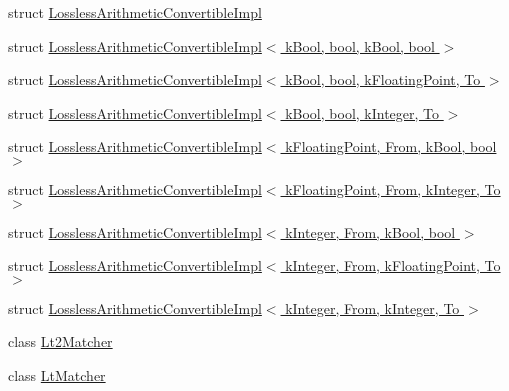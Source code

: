 \begin{DoxyCompactItemize}
\item 
struct \hyperlink{structtesting_1_1internal_1_1_lossless_arithmetic_convertible_impl}{Lossless\+Arithmetic\+Convertible\+Impl}
\item 
struct \hyperlink{structtesting_1_1internal_1_1_lossless_arithmetic_convertible_impl_3_01k_bool_00_01bool_00_01k_bool_00_01bool_01_4}{Lossless\+Arithmetic\+Convertible\+Impl$<$ k\+Bool, bool, k\+Bool, bool $>$}
\item 
struct \hyperlink{structtesting_1_1internal_1_1_lossless_arithmetic_convertible_impl_3_01k_bool_00_01bool_00_01k_floating_point_00_01_to_01_4}{Lossless\+Arithmetic\+Convertible\+Impl$<$ k\+Bool, bool, k\+Floating\+Point, To $>$}
\item 
struct \hyperlink{structtesting_1_1internal_1_1_lossless_arithmetic_convertible_impl_3_01k_bool_00_01bool_00_01k_integer_00_01_to_01_4}{Lossless\+Arithmetic\+Convertible\+Impl$<$ k\+Bool, bool, k\+Integer, To $>$}
\item 
struct \hyperlink{structtesting_1_1internal_1_1_lossless_arithmetic_convertible_impl_3_01k_floating_point_00_01_from_00_01k_bool_00_01bool_01_4}{Lossless\+Arithmetic\+Convertible\+Impl$<$ k\+Floating\+Point, From, k\+Bool, bool $>$}
\item 
struct \hyperlink{structtesting_1_1internal_1_1_lossless_arithmetic_convertible_impl_3_01k_floating_point_00_01_from_00_01k_integer_00_01_to_01_4}{Lossless\+Arithmetic\+Convertible\+Impl$<$ k\+Floating\+Point, From, k\+Integer, To $>$}
\item 
struct \hyperlink{structtesting_1_1internal_1_1_lossless_arithmetic_convertible_impl_3_01k_integer_00_01_from_00_01k_bool_00_01bool_01_4}{Lossless\+Arithmetic\+Convertible\+Impl$<$ k\+Integer, From, k\+Bool, bool $>$}
\item 
struct \hyperlink{structtesting_1_1internal_1_1_lossless_arithmetic_convertible_impl_3_01k_integer_00_01_from_00_01k_floating_point_00_01_to_01_4}{Lossless\+Arithmetic\+Convertible\+Impl$<$ k\+Integer, From, k\+Floating\+Point, To $>$}
\item 
struct \hyperlink{structtesting_1_1internal_1_1_lossless_arithmetic_convertible_impl_3_01k_integer_00_01_from_00_01k_integer_00_01_to_01_4}{Lossless\+Arithmetic\+Convertible\+Impl$<$ k\+Integer, From, k\+Integer, To $>$}
\item 
class \hyperlink{classtesting_1_1internal_1_1_lt2_matcher}{Lt2\+Matcher}
\item 
class \hyperlink{classtesting_1_1internal_1_1_lt_matcher}{Lt\+Matcher}
\item 

\end{DoxyCompactItemize}
